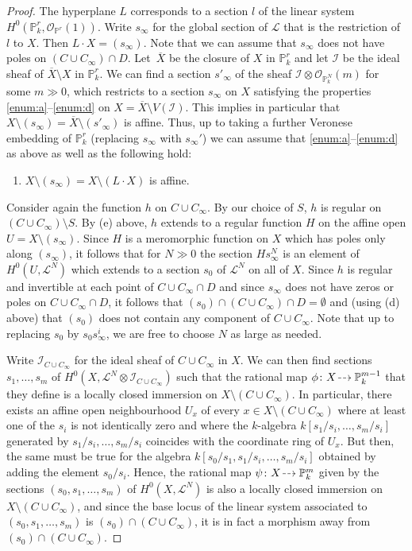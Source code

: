 \documentclass[JEP,XML,SOM,Unicode,published]{cedram}
\let\mathcal\mathscr
\newcommand{\dradpl}{{\hspace*{-2.5mm}\begin{tikzcd}[ampersand replacement=\&,column sep = scriptsize]\mbox{}\ar[r,dashed]\&\mbox{}\end{tikzcd}\hspace*{-2.5mm}}}
\newcommand{\dratst}{{\hspace*{-2.5mm}\begin{tikzcd}[ampersand replacement=\&,column sep = small]\mbox{}\ar[r,dashed]\&\mbox{}\end{tikzcd}\hspace*{-2mm}}}
\let\drascst\dratst
\newcommand{\dra}{\mathchoice{\dradpl}{\dratst}{\drascst}{\drascst}}
\theoremstyle{definition}
\newcommand{\sI}{{\mathcal I}}
\newcommand{\sL}{{\mathcal L}}
\newcommand{\sO}{{\mathcal O}}\let\cO\sO
\renewcommand{\P}{{\mathbb P}}
\let\ov\overline
\begin{document}
\begin{proof}
The hyperplane $L$ corresponds to a section $l$ of the linear system
$H^0(\P^r_k, \sO_{\P^r}(1))$. Write $s_\infty$ for the global section of
$\sL$ that is the restriction of $l$ to $X$. Then $L\cdot X = (s_\infty)$.
Note that we can assume that $s_\infty$ does not have poles on
$(C\cup C_\infty) \cap D$.
Let~$\ov{X}$ be the closure of $X$ in $\P^r_k$ and let $\sI$ be the ideal
sheaf of $\ov{X} \setminus X$ in $\P^r_k$. We can find a section
$s'_{\infty}$ of the sheaf $\sI \otimes \sO_{\P^N_k}(m)$ for some
$m \gg 0$, which restricts to a section $s_{\infty}$ on $X$ satisfying
the properties \eqref{enum:a}--\eqref{enum:d} on $X = \ov{X} \setminus V(\sI)$.
This implies in particular that
$X \setminus (s_{\infty}) = \ov{X} \setminus (s'_{\infty})$
is affine. Thus, up to taking a further Veronese embedding of $\P^r_k$
(replacing $s_\infty$ with $s_\infty'$) we can assume that \eqref{enum:a}--\eqref{enum:d} as above as
well as the following hold:
\begin{enumerate}\renewcommand{\theenumi}{\alph{enumi}}
\setcounter{enumi}{4}
\item\label{enum:e}
$X \setminus (s_\infty) = X \setminus (L\cdot X)$ is affine.
\end{enumerate}

Consider again the function $h$ on $C \cup C_\infty$. By our choice of $S$,
$h$ is regular on $(C\cup C_\infty) \setminus S$. By (e) above, $h$ extends to a
regular function $H$ on the affine open $U = X \setminus (s_{\infty})$. Since
$H$ is a meromorphic function on $X$ which has poles only along
$(s_{\infty})$, it follows that for $N\gg 0$ the section $H s_\infty^N$ is an
element of $H^0(U, \sL^{N})$ which extends to a section $s_0$ of $\sL^N$
on all of $X$. Since $h$ is regular and invertible at each point of
$C\cup C_\infty \cap D$ and since $s_\infty$ does not have zeros or poles on
$C\cup C_\infty \cap D$, it follows that
$(s_0)\cap (C\cup C_\infty)\cap D = \emptyset$ and (using (d) above) that
$(s_0)$ does not contain any component of $C\cup C_\infty$. Note that up to
replacing $s_0$ by $s_0s_\infty^i$, we are free to choose $N$ as large as
needed.

Write $\sI_{C \cup C_\infty}$ for the ideal sheaf of $C\cup C_\infty$ in $X$. We
can then find sections $s_1,\ldots, s_m$ of
$H^0(X, \sL^{N} \otimes \sI_{C \cup C_\infty})$ such that the rational map
$\phi\colon X\dra \P^{m-1}_k$ that they define is a locally closed
immersion on $X\setminus (C\cup C_\infty)$. In particular, there exists an
affine open neighbourhood $U_x$ of every
$x\in X\setminus (C\cup C_\infty)$ where at least one of the $s_i$ is not
identically zero and where the $k$-algebra $k[s_1/s_i, \ldots, s_m/s_i]$
generated by $s_1/s_i, \ldots, s_m/s_i$ coincides with the coordinate ring of
$U_x$. But then, the same must be true for the algebra
$k[s_0/s_1, s_1/s_i, \ldots, s_m/s_i]$ obtained by adding the element
$s_0/s_i$. Hence, the rational map $\psi\colon X \dra \P^m_k$ given
by the sections $(s_0, s_1, \ldots, s_m)$ of $H^0(X, \sL^{N})$ is also a
locally closed immersion on $X\setminus (C\cup C_\infty)$, and since the base
locus of the linear system associated to $(s_0, s_1, \ldots, s_m)$ is
$(s_0)\cap (C\cup C_\infty)$, it is in fact a morphism away from
$(s_0) \cap (C\cup C_\infty)$.


\end{proof}
\end{document}
